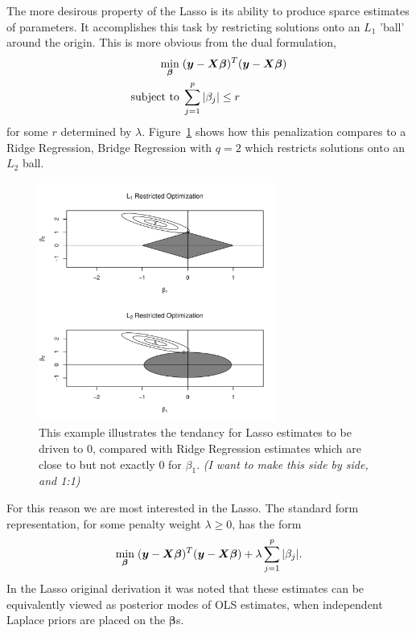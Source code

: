 \documentclass{uwstat572}
\begin{document}
The more desirous property of the Lasso is its ability to produce sparce estimates of parameters. It accomplishes this task by restricting solutions onto an $L_1$ 'ball' around the origin. This is more obvious from the dual formulation, 
\begin{align*}
\min_{\boldsymbol{\beta}}  \hspace{.1cm} &(\boldsymbol{y}-\boldsymbol{X}\boldsymbol{\beta})^T(\boldsymbol{y}-\boldsymbol{X}\boldsymbol{\beta})\\
\text{subject to} \hspace{.1cm}&\sum_{j=1}^p|\beta_j|\leq r
\end{align*}
for some $r$ determined by $\lambda$. Figure~\ref{LassoPlot} shows how this penalization compares to a Ridge Regression, Bridge Regression with $q=2$ which restricts solutions onto an $L_2$ ball.\cite{park2008bayesian}

\begin{figure}\label{LassoPlot}
  \centering
    \includegraphics[width=0.7\textwidth]{LassoPlot.pdf}
  \caption{This example illustrates the tendancy for Lasso estimates to be driven to 0, compared with Ridge Regression estimates which are close to but not exactly 0 for $\beta_1$. \emph{\color{red} (I want to make this side by side, and 1:1)\color{black}}}
\end{figure}

For this reason we are most interested in the Lasso. The standard form representation, for some penalty weight $\lambda \geq 0$, has the form \[
\min_{\boldsymbol{\beta}}  \hspace{.1cm} (\boldsymbol{y}-\boldsymbol{X}\boldsymbol{\beta})^T(\boldsymbol{y}-\boldsymbol{X}\boldsymbol{\beta})+\lambda\sum_{j=1}^p|\beta_j|.
\] In the Lasso original derivation it was noted that these estimates can be equivalently viewed as posterior modes of OLS estimates, when independent Laplace priors are placed on the $\boldsymbol{\beta}$s.\cite{tibshirani1996regression}
\end{document}
